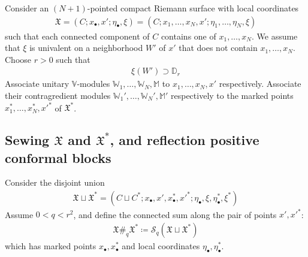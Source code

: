 \documentclass[11pt,b5paper,notitlepage]{article}
\theoremstyle{definition}
\theoremstyle{plain}
\newcommand{\fk}{\mathfrak}
\newcommand{\mc}{\mathcal}
\newcommand{\blt}{\bullet}
\newcommand{\Vbb}{\mathbb V}
\newcommand{\Wbb}{\mathbb W}
\newcommand{\Mbb}{\mathbb M}
\newcommand{\Dbb}{\mathbb D}
\numberwithin{equation}{section}
\begin{document}
Consider an $(N+1)$-pointed compact Riemann surface with local coordinates
\begin{align}
\fk X=(C;x_\blt,x';\eta_\blt,\xi)=(C;x_1,\dots,x_N,x';\eta_1,\dots,\eta_N,\xi)  \label{eq25}
\end{align}
such that each connected component of $C$ contains one of $x_1,\dots,x_N$. We assume that $\xi$ is univalent on a neighborhood $W'$ of $x'$ that does not contain $x_1,\dots,x_N$. Choose $r>0$ such that
\begin{align*}
\xi(W')\supset\Dbb_r
\end{align*}
Associate unitary $\Vbb$-modules $\Wbb_1,\dots,\Wbb_N,\Mbb$ to $x_1,\dots,x_N,x'$ respectively. Associate their contragredient modules $\Wbb_1',\dots,\Wbb_N',\Mbb'$ respectively to the marked points $x_1^*,\dots,x_N^*,x'^*$ of $\fk X^*$.




\subsection{Sewing $\fk X$ and $\fk X^*$, and reflection positive conformal blocks}








Consider the disjoint union
\begin{align}\label{eq52}
\fk X\sqcup\fk X^*=(C\sqcup C^*;x_\blt,x',x_\blt^*,x'^*;\eta_\blt,\xi,\eta_\blt^*,\xi^*)
\end{align}
Assume $0<q<r^2$, and define the connected sum \index{XX@$\fk X\#_q\fk X^*=\mc S_q(\fk X\sqcup\fk X^*)$}  along the pair of points $x',x'^*$:
\begin{align}\label{eq53}
\fk X\#_q\fk X^*\coloneq\mc S_q(\fk X\sqcup\fk X^*)
\end{align}
which has marked points $x_\blt,x_\blt^*$ and local coordinates $\eta_\blt,\eta_\blt^*$. 
\end{document}
